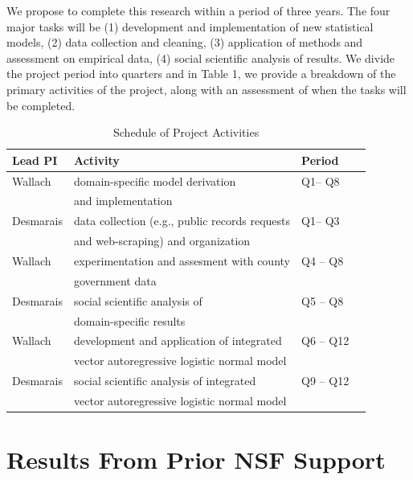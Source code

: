 We propose to complete this research within a period of three years. The four major tasks will be (1) development and implementation of new statistical models, (2) data collection and cleaning, (3) application of methods and assessment on empirical data, (4) social scientific analysis of results. We divide the project period into quarters and in Table 1, we provide a breakdown of the primary activities of the project, along with an assessment of when the tasks will be completed.


\begin{table}[h]
\caption{Schedule of Project Activities}
\begin{center}
\begin{tabular}{|l|l|l|l|}
\hline
{\bf Lead PI} & {\bf Activity} & {\bf Period} \\ \hline
Wallach & domain-specific model derivation   &   Q1-- Q8 \\
& and implementation &  \\ \hline
Desmarais & data collection (e.g., public records requests  & Q1-- Q3 \\
&  and web-scraping)  and organization & \\ \hline
Wallach & experimentation and assesment with county & Q4 -- Q8 \\
&  government data & \\ \hline
Desmarais & social scientific analysis  of & Q5 -- Q8 \\
& domain-specific results & \\ \hline
Wallach & development and application of integrated & Q6 -- Q12 \\
& vector autoregressive logistic normal model & \\ \hline
Desmarais & social scientific analysis of integrated & Q9 -- Q12 \\
& vector autoregressive logistic normal model & \\ \hline

\end{tabular}
\end{center}
\label{schedule}
\end{table}%


\vspace{-.75cm}

\section{Results From Prior NSF Support}


